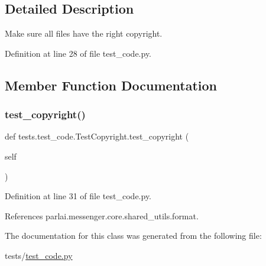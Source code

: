 \subsection{Detailed Description}
\begin{DoxyVerb}Make sure all files have the right copyright.\end{DoxyVerb}
 

Definition at line 28 of file test\+\_\+code.\+py.



\subsection{Member Function Documentation}
\mbox{\label{classtests_1_1test__code_1_1TestCopyright_a8c4a7409a6baf1ecd2b5be03b08ef56d}} 
\subsubsection{\texorpdfstring{test\+\_\+copyright()}{test\_copyright()}}
{\footnotesize\ttfamily def tests.\+test\+\_\+code.\+Test\+Copyright.\+test\+\_\+copyright (\begin{DoxyParamCaption}\item[{}]{self }\end{DoxyParamCaption})}



Definition at line 31 of file test\+\_\+code.\+py.



References parlai.\+messenger.\+core.\+shared\+\_\+utils.\+format.



The documentation for this class was generated from the following file\+:\begin{DoxyCompactItemize}
\item 
tests/\hyperlink{test__code_8py}{test\+\_\+code.\+py}\end{DoxyCompactItemize}
